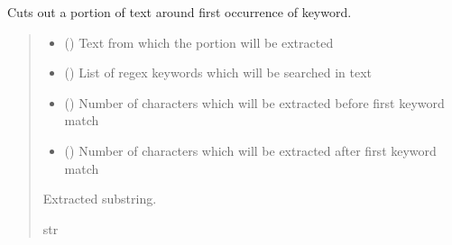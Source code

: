 \documentclass[letterpaper,10pt,english]{sphinxmanual}
\begin{document}
\begin{fulllineitems}
\label{\detokenize{direct_analysis:direct_analysis.get_section}}
\pysigstartsignatures
\pysiglinewithargsret
{}
{\sphinxparamcomma {}\sphinxparamcomma {}\sphinxparamcomma {}}
{}
\pysigstopsignatures
\sphinxAtStartPar
Cuts out a portion of text around first occurrence of keyword.
\begin{quote}\begin{description}
\begin{itemize}
\item {} 
\sphinxAtStartPar
{} () \textendash{} Text from which the portion will be extracted

\item {} 
\sphinxAtStartPar
{} () \textendash{} List of regex keywords which will be searched in text

\item {} 
\sphinxAtStartPar
{} () \textendash{} Number of characters which will be extracted before first keyword match

\item {} 
\sphinxAtStartPar
{} () \textendash{} Number of characters which will be extracted after first keyword match

\end{itemize}

\sphinxAtStartPar
Extracted substring.

\sphinxAtStartPar
str

\end{description}\end{quote}

\end{fulllineitems}
\end{document}
